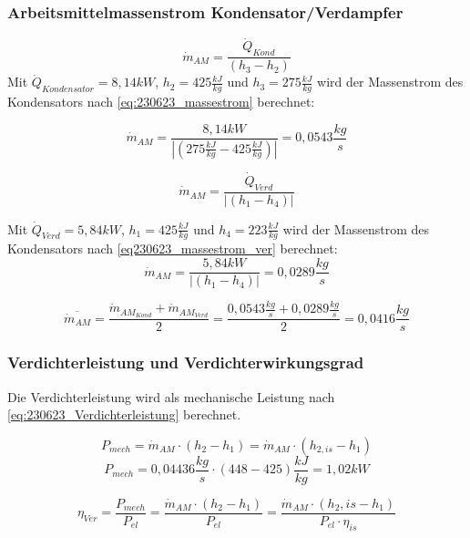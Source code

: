 \subsubsection{Arbeitsmittelmassenstrom Kondensator/Verdampfer}
\begin{equation}
   \dot m_{AM} = \frac{\dot Q_{Kond}}{(h_3 - h_2)}
   \label{eq:230623_massestrom}
\end{equation}
Mit $\dot Q_{Kondensator}=8,14kW$, $h_2=425\frac{kJ}{kg}$ und $h_3=275\frac{kJ}{kg}$ wird der Massenstrom des Kondensators nach \autoref*{eq:230623_massestrom} berechnet:

$$ \dot m_{AM} = \frac{8,14kW}{|(275\frac{kJ}{kg} - 425\frac{kJ}{kg})|} = 0,0543 \frac{kg}{s} $$

\begin{equation}
  \dot m_{AM} = \frac{\dot Q_{Verd}}{|(h_1-h_4)|}
    \label{eq230623_massestrom_ver}
\end{equation}

Mit $\dot Q_{Verd}=5,84kW$, $h_1=425\frac{kJ}{kg}$ und $h_4=223\frac{kJ}{kg}$ wird der Massenstrom des Kondensators nach \autoref*{eq230623_massestrom_ver} berechnet:
$$\dot m_{AM} = \frac{5,84 kW}{|(h_1-h_4)|} = 0,0289 \frac{kg}{s}$$

$$\overline{\dot m_{AM}} = \frac{\dot m_{AM_{Kond}}+\dot m_{AM_{Verd}}}{2} = \frac{0,0543 \frac{kg}{s}+0,0289 \frac{kg}{s}}{2} = 0,0416 \frac{kg}{s} $$



\subsubsection{Verdichterleistung und Verdichterwirkungsgrad}

Die Verdichterleistung wird als mechanische Leistung nach \autoref{eq:230623_Verdichterleistung} berechnet.

\begin{equation}
    P_{mech} = \dot m_{AM} \cdot (h_2-h_1) = \dot m_{AM}\cdot (h_{2,is}-h_1)
\label{eq:230623_Verdichterleistung}
\end{equation}
$$  P_{mech} = 0,04436 \frac{kg}{s} \cdot (448-425)\frac{kJ}{kg} = 1,02 kW $$

\begin{equation}
  \eta_{Ver} = \frac{P_{mech}}{P_{el}}=\frac{\dot m_{AM}\cdot (h_2-h_1)}{P_{el}}=\frac{\dot m_{AM}\cdot (h_2,is-h_1)}{P_{el}\cdot \eta_{is}}
\label{eq:230623_Verdichterwirkungsgrad}
\end{equation}


